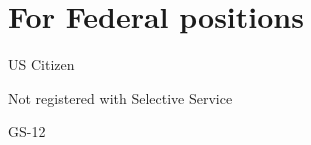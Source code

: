 \documentclass[letterpaper]{resume_config}
\begin{document}
\vspace{-6mm}
\section{For Federal positions}
\begin{SkillsList}
	\item US Citizen
	\item Not registered with Selective Service 
	\item GS-12
\end{SkillsList}
\end{document}
